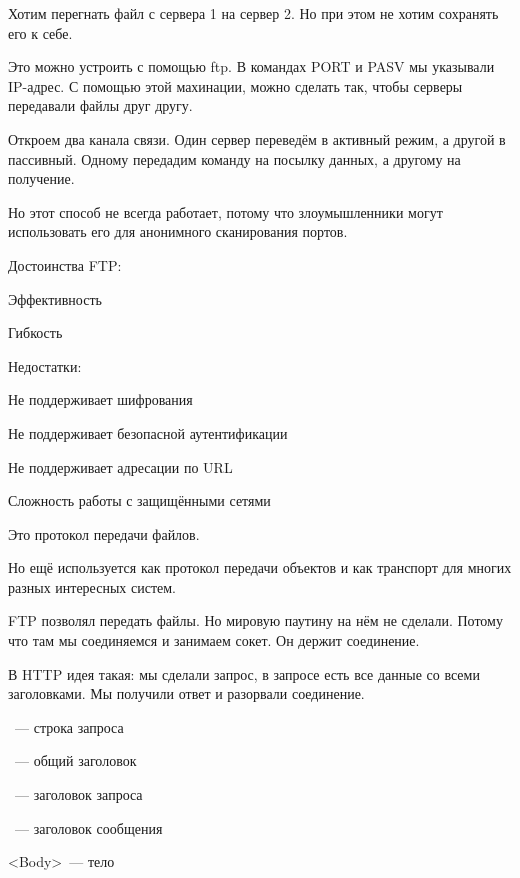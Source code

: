 Хотим перегнать файл с сервера 1 на сервер 2. Но при этом не хотим сохранять его к себе. 

Это можно устроить с помощью ftp. В командах PORT и PASV мы указывали IP-адрес. С помощью этой махинации, можно сделать так, чтобы серверы передавали файлы друг другу.

Откроем два канала связи. Один сервер переведём в активный режим, а другой в пассивный. Одному передадим команду на посылку данных, а другому на получение.

Но этот способ не всегда работает, потому что злоумышленники могут использовать его для анонимного сканирования портов.

Достоинства FTP:
\begin{MyItemize}
    \item Эффективность
    \item Гибкость
\end{MyItemize}

Недостатки:
\begin{MyItemize}
    \item Не поддерживает шифрования
    \item Не поддерживает безопасной аутентификации
    \item Не поддерживает адресации по URL
    \item Сложность работы с защищёнными сетями
\end{MyItemize}


Это протокол передачи файлов.

Но ещё используется как протокол передачи объектов и как транспорт для многих разных интересных систем.

FTP позволял передать файлы. Но мировую паутину на нём не сделали. Потому что там мы соединяемся и занимаем сокет. Он держит соединение. 

В HTTP идея такая: мы сделали запрос, в запросе есть все данные со всеми заголовками. Мы получили ответ и разорвали соединение.

\begin{MyItemize}
    \item <Request-line>~--- строка запроса
    \item <General-header>~--- общий заголовок
    \item <Request-header>~--- заголовок запроса
    \item <Entity-header>~--- заголовок сообщения
    \item <Body>~--- тело
\end{MyItemize}

